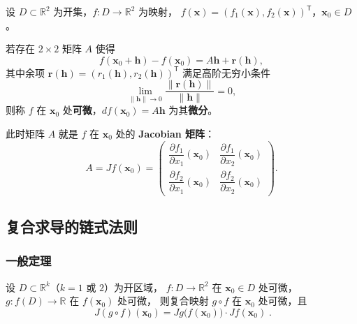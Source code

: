 \documentclass[lang=cn,11pt]{elegantbook}
\begin{document}
\begin{definition}[映射的可微性] \label{def:mapping-diff}
设 $D\subset\mathbb R^2$ 为开集，$f:D\to\mathbb R^2$ 为映射，
$f(\boldsymbol x)=(f_1(\boldsymbol x),f_2(\boldsymbol x))^{\mathsf T}$，$\boldsymbol x_0\in D$。

若存在 $2\times 2$ 矩阵 $A$ 使得
\[
f(\boldsymbol x_0+\boldsymbol h)-f(\boldsymbol x_0)=A\boldsymbol h+\boldsymbol r(\boldsymbol h),
\]
其中余项 $\boldsymbol r(\boldsymbol h)=(r_1(\boldsymbol h),r_2(\boldsymbol h))^{\mathsf T}$ 满足高阶无穷小条件
\[
\lim_{\|\boldsymbol h\|\to 0}\frac{\|\boldsymbol r(\boldsymbol h)\|}{\|\boldsymbol h\|}=0,
\]
则称 $f$ 在 $\boldsymbol x_0$ 处\textbf{可微}，$df(\boldsymbol x_0)=A\boldsymbol h$ 为其\textbf{微分}。

此时矩阵 $A$ 就是 $f$ 在 $\boldsymbol x_0$ 处的 \textbf{Jacobian 矩阵}：
\[
A=Jf(\boldsymbol x_0)
=\begin{pmatrix}
\dfrac{\partial f_1}{\partial x_1}(\boldsymbol x_0) & \dfrac{\partial f_1}{\partial x_2}(\boldsymbol x_0) \\[8pt]
\dfrac{\partial f_2}{\partial x_1}(\boldsymbol x_0) & \dfrac{\partial f_2}{\partial x_2}(\boldsymbol x_0)
\end{pmatrix}.
\]
\end{definition}


\subsection{复合求导的链式法则}

\subsubsection*{一般定理}

\begin{theorem} \label{thm:chain-rule-matrix}
设 $D\subset\mathbb R^k$（$k=1$ 或 $2$）为开区域，
$f:D\to\mathbb R^2$ 在 $\boldsymbol x_0\in D$ 处可微，
$g:f(D)\to\mathbb R$ 在 $f(\boldsymbol x_0)$ 处可微，
则复合映射 $g\circ f$ 在 $\boldsymbol x_0$ 处可微，且
\[
\boxed{\;J(g\circ f)(\boldsymbol x_0)=Jg\bigl(f(\boldsymbol x_0)\bigr)\cdot Jf(\boldsymbol x_0)\;}.
\]
\end{theorem}
\end{document}

